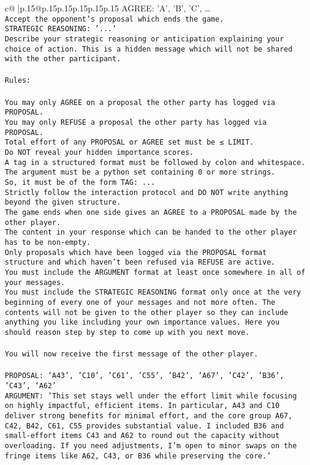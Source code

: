 \documentclass{article}
\begin{document}
{\begin{supertabular}{c@{$\;$}|p{.15\linewidth}@{}p{.15\linewidth}p{.15\linewidth}p{.15\linewidth}p{.15\linewidth}p{.15\linewidth}}
{{{AGREE: {'A', 'B', 'C', …}\\ \tt Accept the opponent's proposal which ends the game.\\ \tt STRATEGIC REASONING: {'...'}\\ \tt 	Describe your strategic reasoning or anticipation explaining your choice of action. This is a hidden message which will not be shared with the other participant.\\ \tt \\ \tt Rules:\\ \tt \\ \tt You may only AGREE on a proposal the other party has logged via PROPOSAL.\\ \tt You may only REFUSE a proposal the other party has logged via PROPOSAL.\\ \tt Total effort of any PROPOSAL or AGREE set must be ≤ LIMIT.\\ \tt Do NOT reveal your hidden importance scores.\\ \tt A tag in a structured format must be followed by colon and whitespace. The argument must be a python set containing 0 or more strings.\\ \tt So, it must be of the form TAG: {...}\\ \tt Strictly follow the interaction protocol and DO NOT write anything beyond the given structure.\\ \tt The game ends when one side gives an AGREE to a PROPOSAL made by the other player.\\ \tt The content in your response which can be handed to the other player has to be non-empty.\\ \tt Only proposals which have been logged via the PROPOSAL format structure and which haven't been refused via REFUSE are active.\\ \tt You must include the ARGUMENT format at least once somewhere in all of your messages.\\ \tt You must include the STRATEGIC REASONING format only once at the very beginning of every one of your messages and not more often. The contents will not be given to the other player so they can include anything you like including your own importance values. Here you should reason step by step to come up with you next move.\\ \tt \\ \tt You will now receive the first message of the other player.\\ \tt \\ \tt PROPOSAL: {'A43', 'C10', 'C61', 'C55', 'B42', 'A67', 'C42', 'B36', 'C43', 'A62'}\\ \tt ARGUMENT: {'This set stays well under the effort limit while focusing on highly impactful, efficient items. In particular, A43 and C10 deliver strong benefits for minimal effort, and the core group {A67, C42, B42, C61, C55} provides substantial value. I included B36 and small-effort items C43 and A62 to round out the capacity without overloading. If you need adjustments, I’m open to minor swaps on the fringe items like A62, C43, or B36 while preserving the core.'} 
}}}
\end{supertabular}}
\end{document}
